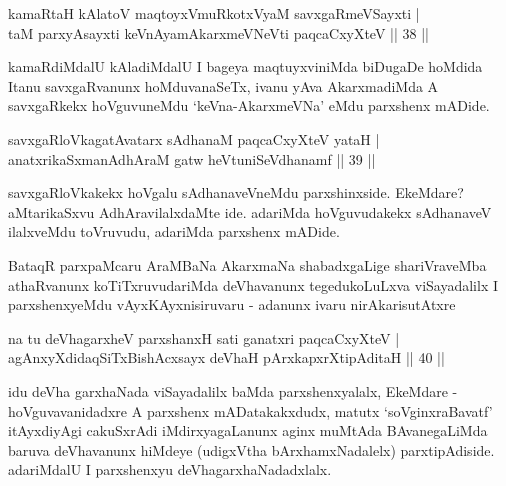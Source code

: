 \begin{shl}
kamaRtaH kAlatoV maqtoyxVmuRkotxV\s yaM savxgaRmeVSayxti |\\
taM parxyAsayxti keVnAyamAkarxmeVNeVti paqcaCxyXteV \hfill || 38 ||
\end{shl}

\begin{artha}
kamaRdiMdalU kAladiMdalU I bageya maqtuyxviniMda biDugaDe hoMdida Itanu savxgaRvanunx hoMduvanaSeTx, ivanu yAva AkarxmadiMda A savxgaRkekx hoVguvuneMdu `keVna-AkarxmeVNa' eMdu parxshenx mADide.
\end{artha}


\begin{shl}
savxgaRloVkagatAvatarx sAdhanaM paqcaCxyXteV yataH |\\
anatxrikaSxmanAdhAraM gatw heVtuniSeVdhanamf \hfill || 39 ||
\end{shl}

\begin{artha}
savxgaRloVkakekx hoVgalu sAdhanaveVneMdu parxshinxside. EkeMdare? aMtarikaSxvu AdhAravilalxdaMte ide. adariMda hoVguvudakekx sAdhanaveV ilalxveMdu toVruvudu, adariMda parxshenx mADide.
\end{artha}

\begin{artha}
BataqR parxpaMcaru AraMBaNa AkarxmaNa shabadxgaLige shariVraveMba athaRvanunx koTiTxruvudariMda deVhavanunx tegedukoLuLxva viSayadalilx I parxshenxyeMdu vAyxKAyxnisiruvaru - adanunx ivaru nirAkarisutAtxre \mdash 
\end{artha}


\begin{shl}
na tu deVhagarxheV parxshanxH sati ganatxri paqcaCxyXteV |\\
agAnxyXdidaqSiTxBishAcxsayx deVhaH pArxkapxrXtipAditaH \hfill || 40 ||
\end{shl}

\begin{artha}
idu deVha garxhaNada viSayadalilx baMda parxshenxyalalx, EkeMdare - hoVguvavanidadxre A parxshenx mADatakakxdudx, matutx `soV\s ginxraBavatf' itAyxdiyAgi cakuSxrAdi iMdirxyagaLanunx aginx muMtAda BAvanegaLiMda baruva deVhavanunx hiMdeye (udigxVtha bArxhamxNadalelx) parxtipAdiside. adariMdalU I parxshenxyu deVhagarxhaNadadxlalx.
\end{artha}

